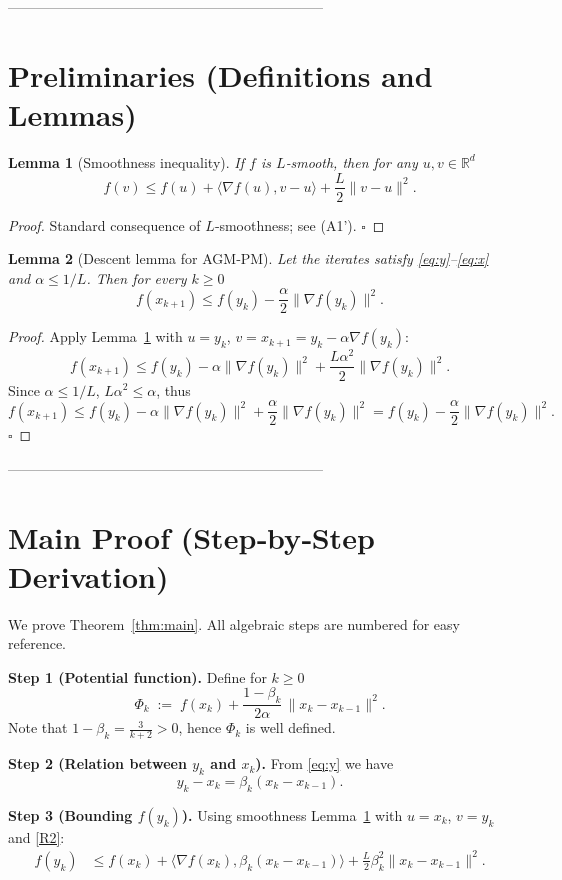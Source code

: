 \documentclass{article}
\newtheorem{lemma}{Lemma}
\begin{document}
--------------------------------------------------------------------

\section*{Preliminaries (Definitions and Lemmas)}
\begin{lemma}[Smoothness inequality]\label{lem:smooth}
If $f$ is $L$‑smooth, then for any $u,v\in\mathbb{R}^d$
\[
f(v)\le f(u)+\langle\nabla f(u),v-u\rangle+\frac{L}{2}\|v-u\|^2 .
\]
\end{lemma}
\begin{proof}
Standard consequence of $L$‑smoothness; see (A1'). \hfill $\square$
\end{proof}

\begin{lemma}[Descent lemma for AGM‑PM]\label{lem:descent}
Let the iterates satisfy \eqref{eq:y}–\eqref{eq:x} and $\alpha\le 1/L$. Then for every $k\ge0$
\[
f(x_{k+1})\le f(y_k)-\frac{\alpha}{2}\|\nabla f(y_k)\|^2 . \tag{L1}
\]
\end{lemma}
\begin{proof}
Apply Lemma~\ref{lem:smooth} with $u=y_k$, $v=x_{k+1}=y_k-\alpha\nabla f(y_k)$:
\[
f(x_{k+1})\le f(y_k)-\alpha\|\nabla f(y_k)\|^2+\frac{L\alpha^2}{2}\|\nabla f(y_k)\|^2 .
\]
Since $\alpha\le 1/L$, $L\alpha^2\le\alpha$, thus
\[
f(x_{k+1})\le f(y_k)-\alpha\|\nabla f(y_k)\|^2+\frac{\alpha}{2}\|\nabla f(y_k)\|^2
= f(y_k)-\frac{\alpha}{2}\|\nabla f(y_k)\|^2 .
\]
\hfill $\square$
\end{proof}

--------------------------------------------------------------------

\section*{Main Proof (Step‑by‑Step Derivation)}
We prove Theorem~\ref{thm:main}. All algebraic steps are numbered for easy reference.

\medskip
\noindent\textbf{Step 1 (Potential function).}  
Define for $k\ge0$
\[
\Phi_k \;:=\; f(x_k)+\frac{1-\beta_k}{2\alpha}\,\|x_k-x_{k-1}\|^2 . \tag{P1}
\]
Note that $1-\beta_k = \frac{3}{k+2}>0$, hence $\Phi_k$ is well defined.

\medskip
\noindent\textbf{Step 2 (Relation between $y_k$ and $x_k$).}  
From \eqref{eq:y} we have
\[
y_k - x_k = \beta_k (x_k-x_{k-1}) . \tag{R2}
\]

\medskip
\noindent\textbf{Step 3 (Bounding $f(y_k)$).}  
Using smoothness Lemma~\ref{lem:smooth} with $u=x_k$, $v=y_k$ and \eqref{R2}:
\[
\begin{aligned}
f(y_k) &\le f(x_k)+\langle\nabla f(x_k),\beta_k (x_k-x_{k-1})\rangle
        +\frac{L}{2}\beta_k^2\|x_k-x_{k-1}\|^2 . \tag{S3}
\end{aligned}
\]
\end{document}
